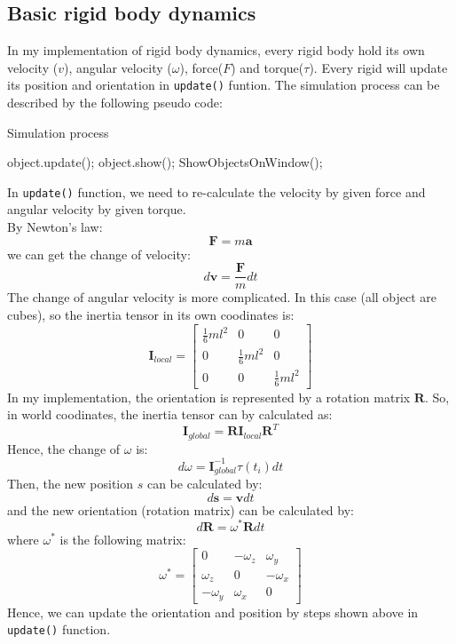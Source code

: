 \documentclass[acmtog]{acmart}
\begin{document}
\subsection{Basic rigid body dynamics}
In my implementation of rigid body dynamics, every rigid body hold its own velocity ($v$), angular velocity
 ($\omega$), force($F$) and torque($\tau$). Every rigid will update its position and orientation in \texttt{update()}
 funtion. The simulation process can be described by the following pseudo code:
\begin{algorithm}
	\caption {Simulation process}	
	\begin{algorithmic}[1]
				\State object.update();
				\State object.show();
			\EndFor
			ShowObjectsOnWindow();
		\EndWhile
	\end{algorithmic}
\end{algorithm}
In \texttt{update()} function, we need to re-calculate the velocity by given force and angular velocity by 
given torque. \\
By Newton's law:
$$\textbf{F} = m\textbf{a}$$
we can get the change of velocity:
$$d\textbf{v} = \frac{\textbf{F}}{m}dt$$
The change of angular velocity is more complicated. In this case (all object are cubes), so the inertia tensor 
in its own coodinates is:
$$\textbf{I}_{local} = \begin{bmatrix}
	\frac{1}{6}ml^2 & 0 & 0\\
	0 & \frac{1}{6}ml^2 & 0\\
	0 & 0 & \frac{1}{6}ml^2
\end{bmatrix}$$
In my implementation, the orientation is represented by a rotation matrix $\textbf{R}$. 
So, in world coodinates, the inertia tensor can by calculated as:
$$\textbf{I}_{global} = \textbf{R}\textbf{I}_{local}\textbf{R}^T$$
Hence, the change of $\omega$ is:
$$d\omega = \textbf{I}_{global}^{-1}\tau(t_i)dt$$
Then, the new position $s$ can be calculated by:
$$d\textbf{s} = \textbf{v}dt$$
and the new orientation (rotation matrix) can be calculated by:
$$d\textbf{R} = \omega^*\textbf{R}dt$$
where $\omega^*$ is the following matrix:
$$\omega^* = \begin{bmatrix}
	0 & -\omega_z & \omega_y\\
	\omega_z & 0 & -\omega_x\\
	-\omega_y & \omega_x & 0
\end{bmatrix}$$
Hence, we can update the orientation and position by steps shown above in \texttt{update()} function.
\end{document}
